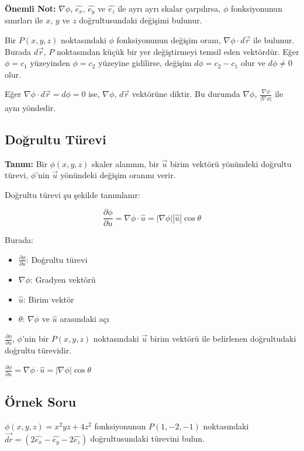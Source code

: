\documentclass[11pt,letterpaper,twocolumn]{fenbil}
\begin{document}
\textbf{Önemli Not:} $\nabla \phi$, $\hat{e_x}$, $\hat{e_y}$ ve $\hat{e_z}$ ile ayrı ayrı skalar çarpılırsa, $\phi$ fonksiyonunun sınırları ile $x$, $y$ ve $z$ doğrultusundaki değişimi bulunur.

Bir $P(x,y,z)$ noktasındaki $\phi$ fonksiyonunun değişim oranı, $\nabla \phi \cdot d\vec{r}$ ile bulunur. Burada $d\vec{r}$, $P$ noktasından küçük bir yer değiştirmeyi temsil eden vektördür. Eğer $\phi = c_1$ yüzeyinden $\phi = c_2$ yüzeyine gidilirse, değişim $d\phi = c_2 - c_1$ olur ve $d\phi \neq 0$ olur.

Eğer $\nabla \phi \cdot d\vec{r} = d\phi = 0$ ise, $\nabla \phi$, $d\vec{r}$ vektörüne diktir. Bu durumda $\nabla \phi$, $\frac{\nabla \phi}{|\nabla \phi|}$ ile aynı yöndedir.

\subsection{Doğrultu Türevi}

\textbf{Tanım:} Bir $\phi(x,y,z)$ skaler alanının, bir $\vec{u}$ birim vektörü yönündeki doğrultu türevi, $\phi$'nin $\vec{u}$ yönündeki değişim oranını verir.

Doğrultu türevi şu şekilde tanımlanır:

\[
\frac{\partial \phi}{\partial u} = \nabla \phi \cdot \hat{u} = |\nabla \phi| |\hat{u}| \cos \theta
\]

Burada:
\begin{itemize}
    \item $\frac{\partial \phi}{\partial u}$: Doğrultu türevi
    \item $\nabla \phi$: Gradyen vektörü
    \item $\hat{u}$: Birim vektör
    \item $\theta$: $\nabla \phi$ ve $\hat{u}$ arasındaki açı
\end{itemize}

$\frac{\partial \phi}{\partial u}$, $\phi$'nin bir $P(x,y,z)$ noktasındaki $\vec{u}$ birim vektörü ile belirlenen doğrultudaki doğrultu türevidir.

$\frac{\partial \phi}{\partial u} = \nabla \phi \cdot \hat{u} = |\nabla \phi| \cos \theta$

\subsection{Örnek Soru}

$\phi(x, y, z) = x^2yz + 4z^2$ fonksiyonunun $P(1, -2, -1)$ noktasındaki $\vec{dr} = (2\hat{e_x} - \hat{e_y} - 2\hat{e_z})$ doğrultusundaki türevini bulun.
\end{document}
